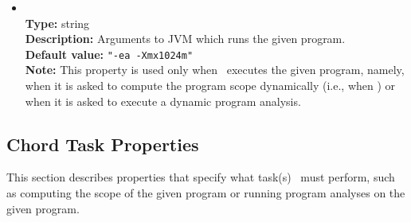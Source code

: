 \begin{itemize}
\item
{} \\
{\bf Type:} string \\
{\bf Description:} Arguments to JVM which runs the given program. \\
{\bf Default value:} {\tt "-ea -Xmx1024m"} \\
{\bf Note:} This property is used only when \Chord\ executes the given program, namely, when it is asked to compute the program scope dynamically (i.e., when ) or when it is asked to execute a dynamic program analysis.
\end{itemize}

\subsection{Chord Task Properties}
\label{sec:chord-sysprops:task}

This section describes properties that specify what task(s) \Chord\ must perform, 
such as computing the scope of the given program or running program analyses on the given program.

